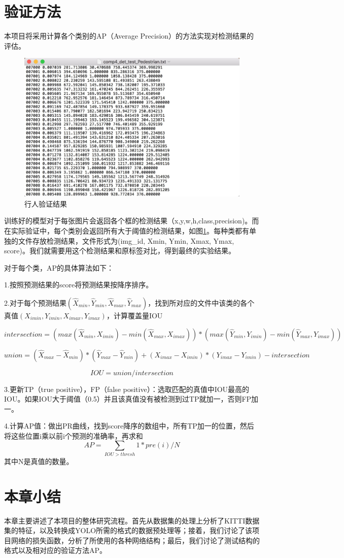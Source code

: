 \section{验证方法}{
	本项目将采用计算各个类别的AP（Average Precision）的方法实现对检测结果的评估\cite{}。

	\begin{figure}[htbp]
	\centering
	\includegraphics[width=5in]{images/results.png}
	\caption{行人验证结果}
	\label{results}
	\end{figure}
	训练好的模型对于每张图片会返回各个框的检测结果（x,y,w,h,class,precision)。而在实际验证中，每个类别会返回所有大于阈值的检测结果，如图\ref{results}。每种类都有单独的文件存放检测结果，文件形式为(img\_id, Xmin, Ymin, Xmax, Ymax, score)。我们就需要用这个检测结果和原标签对比，得到最终的实验结果。

	对于每个类，AP的具体算法如下：

	1.按照预测结果的score将预测结果按降序排序。

	2.对于每个预测结果$(\hat{X}_{min},\hat{Y}_{min},\hat{X}_{max},\hat{Y}_{max})$，找到所对应的文件中该类的各个真值$({X}_{imin},{Y}_{imin},{X}_{imax},{Y}_{imax})$，计算覆盖量IOU

	$$intersection = (max(\hat{X}_{min},{X}_{imin}) - min(\hat{X}_{max},{X}_{imax})) * (max(\hat{Y}_{min},{Y}_{imin}) - min(\hat{Y}_{max},{Y}_{imax}))$$

	$$union = (\hat{X}_{max} - \hat{X}_{min}) * (\hat{Y}_{max} - \hat{Y}_{min}) + ({X}_{imax} - {X}_{imin}) * ({Y}_{imax} - {Y}_{imin}) - intersection$$

	$$IOU = union / intersection$$

	3.更新TP（true positive），FP（false positive）：选取匹配的真值中IOU最高的IOU。如果IOU大于阈值（0.5）并且该真值没有被检测到过TP就加一，否则FP加一。

	4.计算AP值：做出PR曲线，找到score降序的数组中，所有TP加一的位置，然后将这些位置i乘以前i个预测的准确率，再求和
	$$AP = \sum_{IOU>thresh}1*pre(i) / N$$其中N是真值的数量。
}

\section{本章小结}{
	本章主要讲述了本项目的整体研究流程。首先从数据集的处理上分析了KITTI数据集的特征，以及转换成YOLO所需的格式的数据预处理等；接着，我们讨论了该项目网络的损失函数，分析了所使用的各种网络结构；最后，我们讨论了测试结构的格式以及相对应的验证方法AP。
}

